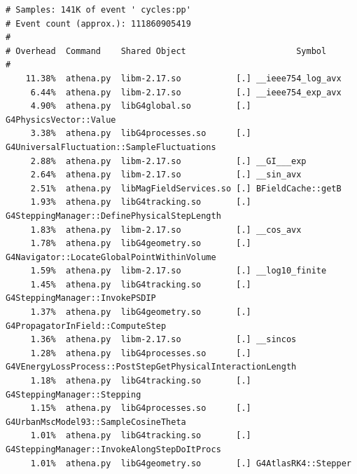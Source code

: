 \documentclass[a4paper]{jpconf}
\begin{document}
\begin{lstlisting}[caption=Recording of event 73 on core 8, label=event-73-processor8]
# Samples: 141K of event ' cycles:pp'
# Event count (approx.): 111860905419
#
# Overhead  Command    Shared Object                      Symbol                                                                                         
#
    11.38%  athena.py  libm-2.17.so           [.] __ieee754_log_avx
     6.44%  athena.py  libm-2.17.so           [.] __ieee754_exp_avx
     4.90%  athena.py  libG4global.so         [.] G4PhysicsVector::Value
     3.38%  athena.py  libG4processes.so      [.] G4UniversalFluctuation::SampleFluctuations
     2.88%  athena.py  libm-2.17.so           [.] __GI___exp
     2.64%  athena.py  libm-2.17.so           [.] __sin_avx
     2.51%  athena.py  libMagFieldServices.so [.] BFieldCache::getB
     1.93%  athena.py  libG4tracking.so       [.] G4SteppingManager::DefinePhysicalStepLength
     1.83%  athena.py  libm-2.17.so           [.] __cos_avx
     1.78%  athena.py  libG4geometry.so       [.] G4Navigator::LocateGlobalPointWithinVolume
     1.59%  athena.py  libm-2.17.so           [.] __log10_finite
     1.45%  athena.py  libG4tracking.so       [.] G4SteppingManager::InvokePSDIP
     1.37%  athena.py  libG4geometry.so       [.] G4PropagatorInField::ComputeStep
     1.36%  athena.py  libm-2.17.so           [.] __sincos
     1.28%  athena.py  libG4processes.so      [.] G4VEnergyLossProcess::PostStepGetPhysicalInteractionLength
     1.18%  athena.py  libG4tracking.so       [.] G4SteppingManager::Stepping
     1.15%  athena.py  libG4processes.so      [.] G4UrbanMscModel93::SampleCosineTheta
     1.01%  athena.py  libG4tracking.so       [.] G4SteppingManager::InvokeAlongStepDoItProcs
     1.01%  athena.py  libG4geometry.so       [.] G4AtlasRK4::Stepper

\end{lstlisting}

\end{document}

